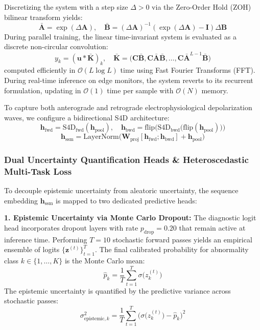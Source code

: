 \documentclass[journal,11pt,draftclsnofoot,onecolumn]{IEEEtran}
\begin{document}
Discretizing the system with a step size $\Delta > 0$ via the Zero-Order Hold (ZOH) bilinear transform yields:
\begin{equation}
    \bar{\mathbf{A}} = \exp(\Delta \mathbf{A}), \quad \bar{\mathbf{B}} = (\Delta \mathbf{A})^{-1}(\exp(\Delta \mathbf{A}) - \mathbf{I})\Delta \mathbf{B}
\end{equation}
During parallel training, the linear time-invariant system is evaluated as a discrete non-circular convolution:
\begin{equation}
    y_k = (\mathbf{u} * \bar{\mathbf{K}})_k, \quad \bar{\mathbf{K}} = \big(\mathbf{C}\bar{\mathbf{B}}, \mathbf{C}\bar{\mathbf{A}}\bar{\mathbf{B}}, \dots, \mathbf{C}\bar{\mathbf{A}}^{L-1}\bar{\mathbf{B}}\big)
\end{equation}
computed efficiently in $\mathcal{O}(L \log L)$ time using Fast Fourier Transforms (FFT). During real-time inference on edge monitors, the system reverts to its recurrent formulation, updating in $\mathcal{O}(1)$ time per sample with $\mathcal{O}(N)$ memory.

To capture both anterograde and retrograde electrophysiological depolarization waves, we configure a bidirectional S4D architecture:
\begin{equation}
    \mathbf{h}_{\text{fwd}} = \text{S4D}_{\text{fwd}}(\mathbf{h}_{\text{pool}}), \quad \mathbf{h}_{\text{bwd}} = \text{flip}\Big(\text{S4D}_{\text{bwd}}\big(\text{flip}(\mathbf{h}_{\text{pool}})\big)\Big)
\end{equation}
\begin{equation}
    \mathbf{h}_{\text{ssm}} = \text{LayerNorm}\Big(\mathbf{W}_{\text{proj}}[\mathbf{h}_{\text{fwd}}; \mathbf{h}_{\text{bwd}}] + \mathbf{h}_{\text{pool}}\Big)
\end{equation}

\subsubsection{Dual Uncertainty Quantification Heads \& Heteroscedastic Multi-Task Loss}
To decouple epistemic uncertainty from aleatoric uncertainty, the sequence embedding $\mathbf{h}_{\text{ssm}}$ is mapped to two dedicated predictive heads:

\textbf{1. Epistemic Uncertainty via Monte Carlo Dropout:}
The diagnostic logit head incorporates dropout layers with rate $p_{\text{drop}} = 0.20$ that remain active at inference time. Performing $T=10$ stochastic forward passes yields an empirical ensemble of logits $\{\mathbf{z}^{(t)}\}_{t=1}^T$. The final calibrated probability for abnormality class $k \in \{1, \dots, K\}$ is the Monte Carlo mean:
\begin{equation}
    \hat{p}_k = \frac{1}{T} \sum_{t=1}^T \sigma\big(z_k^{(t)}\big)
\end{equation}
The epistemic uncertainty is quantified by the predictive variance across stochastic passes:
\begin{equation}
    \sigma_{\text{epistemic}, k}^2 = \frac{1}{T} \sum_{t=1}^T \Big(\sigma\big(z_k^{(t)}\big) - \hat{p}_k\Big)^2
\end{equation}
\end{document}
